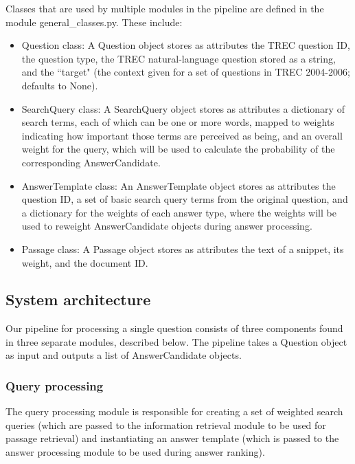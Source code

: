 \documentclass[11pt]{article}
\begin{document}
Classes that are used by multiple modules in the pipeline are defined in the module general\_classes.py. These include:

\begin{itemize}
\item Question class: A Question object stores as attributes the TREC question ID, the question type, the TREC natural-language question stored as a string, and the ``target" (the context given for a set of questions in TREC 2004-2006; defaults to None).
\item SearchQuery class: A SearchQuery object stores as attributes a dictionary of search terms, each of which can be one or more words, mapped to weights indicating how important those terms are perceived as being, and an overall weight for the query, which will be used to calculate the probability of the corresponding AnswerCandidate.
\item AnswerTemplate class: An AnswerTemplate object stores as attributes the question ID, a set of basic search query terms from the original question, and a dictionary for the weights of each answer type, where the weights will be used to reweight AnswerCandidate objects during answer processing.
\item Passage class: A Passage object stores as attributes the text of a snippet, its weight, and the document ID.
\end{itemize}

\subsection{System architecture}

Our pipeline for processing a single question consists of three components found in three separate modules, described below. The pipeline takes a Question object as input and outputs a list of AnswerCandidate objects.

\subsubsection{Query processing}

The query processing module is responsible for creating a set of weighted search queries (which are passed to the information retrieval module to be used for passage retrieval) and instantiating an answer template (which is passed to the answer processing module to be used during answer ranking).
\end{document}
